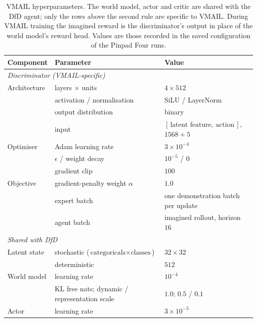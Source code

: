 \begin{table}[t]
\centering
\caption{VMAIL hyperparameters. The world model, actor and critic are shared with the DfD agent; only
the rows above the second rule are specific to VMAIL. During VMAIL training the imagined reward is the
discriminator's output in place of the world model's reward head. Values are those recorded in the saved
configuration of the Pinpad Four runs.}
\label{tab:vmail_hyperparameters}
\begin{tabular}{lll}
\toprule
Component & Parameter & Value \\
\midrule
\multicolumn{3}{l}{\textit{Discriminator (VMAIL-specific)}} \\
Architecture & layers $\times$ units & $4 \times 512$ \\
             & activation / normalisation & SiLU / LayerNorm \\
             & output distribution & binary \\
             & input & $[\,\text{latent feature},\ \text{action}\,]$, $1568 + 5$ \\
Optimiser    & Adam learning rate & $3\times10^{-4}$ \\
             & $\epsilon$ / weight decay & $10^{-5}$ / $0$ \\
             & gradient clip & $100$ \\
Objective    & gradient-penalty weight $\alpha$ & $1.0$ \\
             & expert batch & one demonstration batch per update \\
             & agent batch & imagined rollout, horizon $16$ \\
\midrule
\multicolumn{3}{l}{\textit{Shared with DfD}} \\
Latent state & stochastic ($\text{categoricals} \times \text{classes}$) & $32 \times 32$ \\
             & deterministic & $512$ \\
World model  & learning rate & $10^{-4}$ \\
             & KL free nats; dynamic / representation scale & $1.0$; $0.5$ / $0.1$ \\
Actor        & learning rate & $3\times10^{-5}$ \\

\end{tabular}
\end{table}
